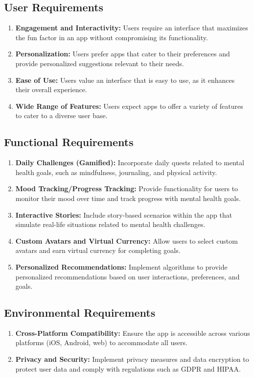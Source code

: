 \documentclass[manuscript,screen,review]{acmart}
\begin{document}
\subsection{User Requirements}
\begin{enumerate}
    \item \textbf{Engagement and Interactivity:} Users require an interface that maximizes the fun factor in an app without compromising its functionality.
    \item \textbf{Personalization:} Users prefer apps that cater to their preferences and provide personalized suggestions relevant to their needs.
    \item \textbf{Ease of Use:} Users value an interface that is easy to use, as it enhances their overall experience.
    \item \textbf{Wide Range of Features:} Users expect apps to offer a variety of features to cater to a diverse user base.
\end{enumerate}

\subsection{Functional Requirements}
\begin{enumerate}
    \item \textbf{Daily Challenges (Gamified):} Incorporate daily quests related to mental health goals, such as mindfulness, journaling, and physical activity.
    \item \textbf{Mood Tracking/Progress Tracking:} Provide functionality for users to monitor their mood over time and track progress with mental health goals.
    \item \textbf{Interactive Stories:} Include story-based scenarios within the app that simulate real-life situations related to mental health challenges.
    \item \textbf{Custom Avatars and Virtual Currency:} Allow users to select custom avatars and earn virtual currency for completing goals.
    \item \textbf{Personalized Recommendations:} Implement algorithms to provide personalized recommendations based on user interactions, preferences, and goals.
\end{enumerate}

\subsection{Environmental Requirements}
\begin{enumerate}
    \item \textbf{Cross-Platform Compatibility:} Ensure the app is accessible across various platforms (iOS, Android, web) to accommodate all users.
    \item \textbf{Privacy and Security:} Implement privacy measures and data encryption to protect user data and comply with regulations such as GDPR and HIPAA.
\end{enumerate}
\end{document}
